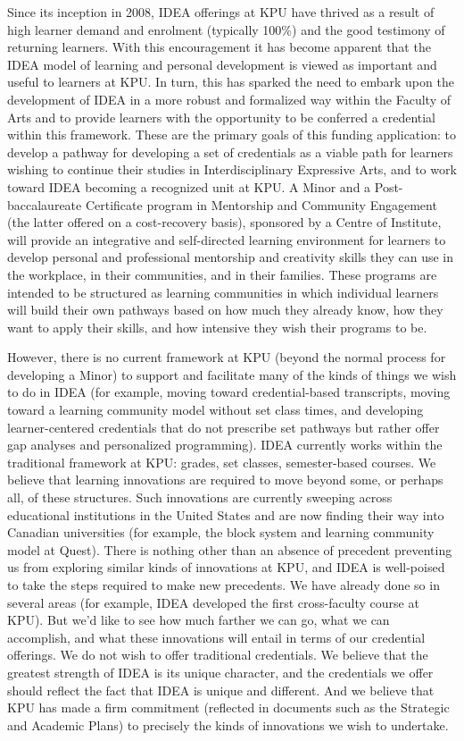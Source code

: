 \documentclass[11pt, letterpaper]{article}
\begin{document}
Since its inception in 2008, IDEA offerings at KPU have thrived as a
result of high learner demand and enrolment (typically 100\%) and the
good testimony of returning learners. With this encouragement it has
become apparent that the IDEA model of learning and personal development
is viewed as important and useful to learners at KPU. In turn, this has
sparked the need to embark upon the development of IDEA in a more robust
and formalized way within the Faculty of Arts and to provide learners
with the opportunity to be conferred a credential within this framework.
These are the primary goals of this funding application: to develop a
pathway for developing a set of credentials as a viable path for
learners wishing to continue their studies in Interdisciplinary
Expressive Arts, and to work toward IDEA becoming a recognized unit at
KPU. A Minor and a Post-baccalaureate Certificate program in Mentorship
and Community Engagement (the latter offered on a cost-recovery basis),
sponsored by a Centre of Institute, will provide an integrative and
self-directed learning environment for learners to develop personal and
professional mentorship and creativity skills they can use in the
workplace, in their communities, and in their families. These programs
are intended to be structured as learning communities in which
individual learners will build their own pathways based on how much they
already know, how they want to apply their skills, and how intensive
they wish their programs to be.

However, there is no current framework at KPU (beyond the normal process
for developing a Minor) to support and facilitate many of the kinds of
things we wish to do in IDEA (for example, moving toward
credential-based transcripts, moving toward a learning community model
without set class times, and developing learner-centered credentials
that do not prescribe set pathways but rather offer gap analyses and
personalized programming). IDEA currently works within the traditional
framework at KPU: grades, set classes, semester-based courses. We
believe that learning innovations are required to move beyond some, or
perhaps all, of these structures. Such innovations are currently
sweeping across educational institutions in the United States and are
now finding their way into Canadian universities (for example, the block
system and learning community model at Quest). There is nothing other
than an absence of precedent preventing us from exploring similar kinds
of innovations at KPU, and IDEA is well-poised to take the steps
required to make new precedents. We have already done so in several
areas (for example, IDEA developed the first cross-faculty course at
KPU). But we'd like to see how much farther we can go, what we can
accomplish, and what these innovations will entail in terms of our
credential offerings. We do not wish to offer traditional credentials.
We believe that the greatest strength of IDEA is its unique character,
and the credentials we offer should reflect the fact that IDEA is unique
and different. And we believe that KPU has made a firm commitment
(reflected in documents such as the Strategic and Academic Plans) to
precisely the kinds of innovations we wish to undertake.
\end{document}
